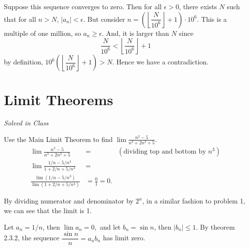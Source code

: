 \documentclass[12pt]{book}
\newenvironment{exercise}[2][Exercise]{\begin{trivlist}
\item[\hskip \labelsep {\bfseries #1}\hskip \labelsep {\bfseries #2.}]}{\end{trivlist}}
\begin{document}
\begin{exercise}{2.2.15}
Suppose this sequence converges to zero. Then for all $\epsilon > 0$, there exists $N$ such that for all $n > N$, $|a_n| < \epsilon.$ But consider $n = \displaystyle \left(\left \lfloor \dfrac{N}{10^6} \right \rfloor + 1\right ) \cdot 10^6.$ This is a multiple of one million, so $a_n \geq \epsilon.$ And, it is larger than $N$ since $$\dfrac{N}{10^6} < \left \lfloor \dfrac{N}{10^6} \right \rfloor+1$$ by definition, $10^6 \left(\left \lfloor \dfrac{N}{10^6} \right \rfloor + 1\right) > N.$ Hence we have a contradiction.
\end{exercise}



\section{Limit Theorems}

\begin{exercise}{2.3.1}
\emph{Solved in Class}
\end{exercise}


\begin{exercise}{2.3.2}
Use the Main Limit Theorem to find $\lim \frac{n^2 - 5}{n^3 + 2n^2 + 5}$. \\
	\begin{align*}
		\lim \frac{n^2 - 5}{n^3 + 2n^2 + 5} &=  &(\text{dividing top and bottom by $n^3$}) \\
		\lim \frac{1/n - 5/n^3}{1+2/n + 5/n^3} &= \\
		\frac{\lim (1/n - 5/n^3)}{\lim (1+2/n + 5/n^3)} &= \frac{0}{1} = 0.
	\end{align*}
\end{exercise}

\begin{exercise}{2.3.3}
By dividing numerator and denominator by $2^n$, in a similar fashion to problem 1, we can see that the limit is 1.



\end{exercise}

\begin{exercise}{2.3.4}
Let $a_n = 1/n$, then $\lim a_n = 0,$ and let $b_n = \sin n$, then $|b_n| \leq 1$. By theorem 2.3.2, the sequence $\dfrac{\sin n}{n} = a_n b_n$ has limit zero.
\end{exercise}
\end{document}
